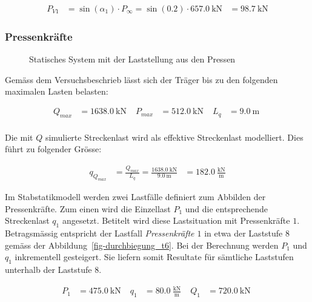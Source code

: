 \documentclass[
  11pt,
  letterpaper,
]{scrreprt}
\begin{document}
$$
\begin{aligned}
P_{V1} &= \sin \left( \alpha_{1} \right) \cdot P_{\infty}  = \sin \left( 0.2 \right) \cdot 657.0\ \mathrm{kN} &= 98.7\ \mathrm{kN}  
\end{aligned}
$$

\subsubsection{Pressenkräfte}\label{pressenkruxe4fte}

\begin{figure}[H]


\caption{\label{fig-t6_lastfall_versuch}Statisches System mit der
Laststellung aus den Pressen}

\end{figure}%

Gemäss dem Versuchsbeschrieb lässt sich der Träger bis zu den folgenden
maximalen Lasten belasten:

$$
\begin{aligned}
Q_{max} &= 1638.0\ \mathrm{kN} \; 
 &P_{max} &= 512.0\ \mathrm{kN} \; 
 &L_{q} &= 9.0\ \mathrm{m} \; 
\\[10pt]
\end{aligned}
$$

Die mit \(Q\) simulierte Streckenlast wird als effektive Streckenlast
modelliert. Dies führt zu folgender Grösse:

$$
\begin{aligned}
q_{Q_{max}} &= \frac{ Q_{max} }{ L_{q} }  = \frac{ 1638.0\ \mathrm{kN} }{ 9.0\ \mathrm{m} } &= 182.0\ \frac{\mathrm{kN}}{\mathrm{m}}  
\end{aligned}
$$

Im Stabstatikmodell werden zwei Lastfälle definiert zum Abbilden der
Pressenkräfte. Zum einen wird die Einzellast \(P_{1}\) und die
entsprechende Streckenlast \(q_{1}\) angesetzt. Betitelt wird diese
Lastsituation mit Pressenkräfte \(1\). Betragsmässig entspricht der
Lastfall \emph{Pressenkräfte \(1\)} in etwa der Laststufe 8 gemäss der
Abbildung~\ref{fig-durchbiegung_t6}. Bei der Berechnung werden \(P_1\)
und \(q_1\) inkrementell gesteigert. Sie liefern somit Resultate für
sämtliche Laststufen unterhalb der Laststufe 8.

$$
\begin{aligned}
P_{1} &= 475.0\ \mathrm{kN} \; 
 &q_{1} &= 80.0\ \frac{\mathrm{kN}}{\mathrm{m}} \; 
 &Q_{1} &= 720.0\ \mathrm{kN} \; 
\\[10pt]
\end{aligned}
$$
\end{document}
